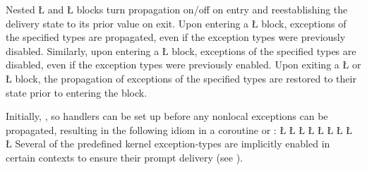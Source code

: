 \documentclass[openright,twoside]{report}
\begin{document}
Nested \LGinlinetrue\LGbegin\lgrinde\L{}\endlgrinde\LGend{} and \LGinlinetrue\LGbegin\lgrinde\L{}\endlgrinde\LGend{} blocks turn propagation on/off on entry and reestablishing the delivery state to its prior value on exit.
Upon entering a \LGinlinetrue\LGbegin\lgrinde\L{}\endlgrinde\LGend{} block, exceptions of the specified types are propagated, even if the exception types were previously disabled.
Similarly, upon entering a \LGinlinetrue\LGbegin\lgrinde\L{}\endlgrinde\LGend{} block, exceptions of the specified types are disabled, even if the exception types were previously enabled.
Upon exiting a \LGinlinetrue\LGbegin\lgrinde\L{}\endlgrinde\LGend{} or \LGinlinetrue\LGbegin\lgrinde\L{}\endlgrinde\LGend{} block, the propagation of exceptions of the specified types are restored to their state prior to entering the block.

Initially, , so handlers can be set up before any nonlocal exceptions can be propagated, resulting in the following \uC idiom in a coroutine or :
\LGinlinefalse\LGbegin\lgrinde
\L{}
\L{\LB{}}
\CE{}\L{\LB{}}
\CE{}\L{\LB{}}
\CE{}\L{\LB{}}
\CE{}\L{\LB{}}
\CE{}\L{\LB{}}
\CE{}\L{\LB{}}
\CE{}\L{\LB{\}}}
\endlgrinde\LGend
Several of the predefined kernel exception-types are implicitly enabled in certain contexts to ensure their prompt delivery (see ).
\end{document}
